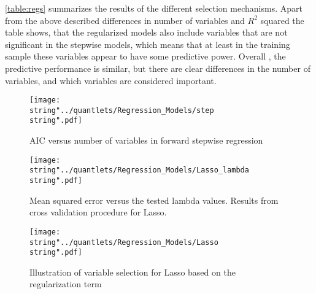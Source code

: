 \autoref{table:regs} summarizes the results of the different selection mechanisms. Apart from the above described differences in number of variables and  $R^{2}$ squared the table shows, that the regularized models also include variables that are not significant in the stepwise models, which means that at least in the training sample these variables appear to have some predictive power. Overall , the predictive performance is similar, but there are clear differences in the number of variables, and which variables are considered important. 
\begin{figure}[H]
  \centering
\texttt{[image: \\string"../quantlets/Regression\_Models/step\\string".pdf]}
  \caption{AIC versus number of variables in forward stepwise regression}\label{fig:step}
\end{figure}
 
\begin{figure}[H]
  \centering
\texttt{[image: \\string"../quantlets/Regression\_Models/Lasso\_lambda\\string".pdf]}
  \caption{Mean squared error versus the tested lambda values. Results from cross validation procedure for Lasso.}\label{fig:Lasso}
\end{figure}

\begin{figure}[H]
  \centering
\texttt{[image: \\string"../quantlets/Regression\_Models/Lasso\\string".pdf]}
  \caption{Illustration of variable selection for Lasso based on the regularization term}\label{fig:Lasso1}
\end{figure}

 
\label{table:regs}
 
\FloatBarrier